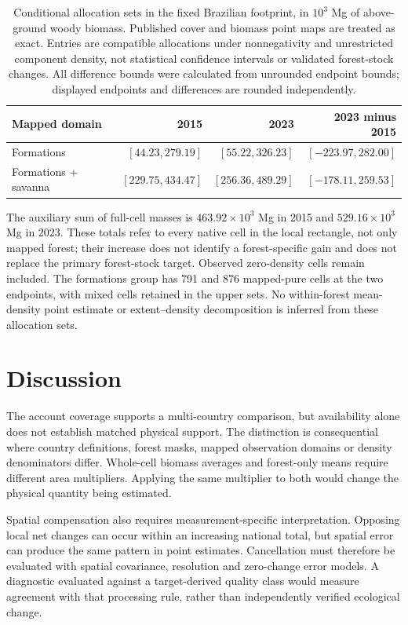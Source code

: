 \documentclass[11pt,a4paper]{article}
\begin{document}
\begin{table}[htbp]
\centering\small
\caption{Conditional allocation sets in the fixed Brazilian footprint, in $10^3$ Mg of above-ground woody biomass. Published cover and biomass point maps are treated as exact. Entries are compatible allocations under nonnegativity and unrestricted component density, not statistical confidence intervals or validated forest-stock changes. All difference bounds were calculated from unrounded endpoint bounds; displayed endpoints and differences are rounded independently.}\label{tab:allocation}
\begin{tabular}{lrrr}
\toprule
Mapped domain & 2015 & 2023 & 2023 minus 2015\\\midrule
Formations & $[44.23, 279.19]$ & $[55.22, 326.23]$ & $[-223.97, 282.00]$ \\
Formations + savanna & $[229.75, 434.47]$ & $[256.36, 489.29]$ & $[-178.11, 259.53]$ \\
\bottomrule
\end{tabular}
\end{table}

The auxiliary sum of full-cell masses is $463.92\times10^3$ Mg in 2015 and $529.16\times10^3$ Mg in 2023. These totals refer to every native cell in the local rectangle, not only mapped forest; their increase does not identify a forest-specific gain and does not replace the primary forest-stock target. Observed zero-density cells remain included. The formations group has 791 and 876 mapped-pure cells at the two endpoints, with mixed cells retained in the upper sets. No within-forest mean-density point estimate or extent--density decomposition is inferred from these allocation sets.



\section{Discussion}
The account coverage supports a multi-country comparison, but availability alone does not establish matched physical support. The distinction is consequential where country definitions, forest masks, mapped observation domains or density denominators differ. Whole-cell biomass averages and forest-only means require different area multipliers. Applying the same multiplier to both would change the physical quantity being estimated.

Spatial compensation also requires measurement-specific interpretation. Opposing local net changes can occur within an increasing national total, but spatial error can produce the same pattern in point estimates. Cancellation must therefore be evaluated with spatial covariance, resolution and zero-change error models. A diagnostic evaluated against a target-derived quality class would measure agreement with that processing rule, rather than independently verified ecological change.
\end{document}
